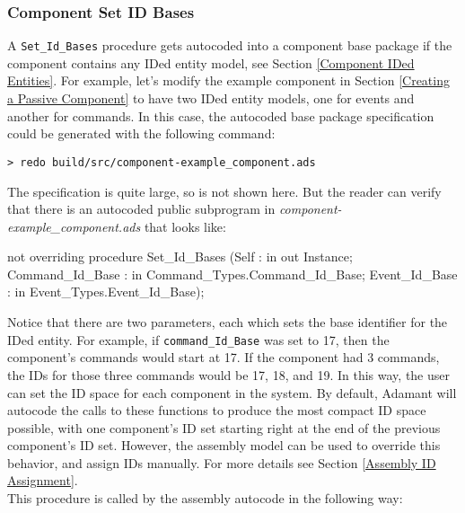 \subsubsection{Component Set ID Bases} \label{Component Set ID Bases}

A \texttt{Set\_Id\_Bases} procedure gets autocoded into a component base package if the component contains any IDed entity model, see Section \ref{Component IDed Entities}. For example, let's modify the example component in Section \ref{Creating a Passive Component} to have two IDed entity models, one for events and another for commands. In this case, the autocoded base package specification could be generated with the following command:

\vspace{5mm} %
\begin{verbatim}
> redo build/src/component-example_component.ads
\end{verbatim}
\vspace{5mm} %

The specification is quite large, so is not shown here. But the reader can verify that there is an autocoded public subprogram in \textit{component-example\_component.ads} that looks like:

\vspace{5mm} %
\begin{adacode}
not overriding procedure Set_Id_Bases (Self : in out Instance; Command_Id_Base : in Command_Types.Command_Id_Base; Event_Id_Base : in Event_Types.Event_Id_Base);
\end{adacode}
\vspace{5mm} %

Notice that there are two parameters, each which sets the base identifier for the IDed entity. For example, if \texttt{command\_Id\_Base} was set to 17, then the component's commands would start at 17. If the component had 3 commands, the IDs for those three commands would be 17, 18, and 19. In this way, the user can set the ID space for each component in the system. By default, Adamant will autocode the calls to these functions to produce the most compact ID space possible, with one component's ID set starting right at the end of the previous component's ID set. However, the assembly model can be used to override this behavior, and assign IDs manually. For more details see Section \ref{Assembly ID Assignment}. \\

This procedure is called by the assembly autocode in the following way:

